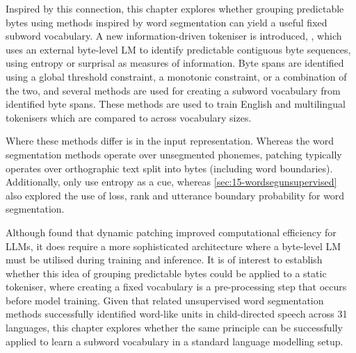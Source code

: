 Inspired by this connection, this chapter explores whether grouping predictable bytes using methods inspired by word segmentation can yield a useful fixed subword vocabulary. A new information-driven tokeniser is introduced, \bytespan, which uses an external byte-level LM to identify predictable contiguous byte sequences, using entropy or surprisal as measures of information. Byte spans are identified using a global threshold constraint, a monotonic constraint, or a combination of the two, and several methods are used for creating a subword vocabulary from identified byte spans. These methods are used to train English and multilingual tokenisers which are compared to \bpe across vocabulary sizes. 




Where these methods differ is in the input representation. Whereas the word segmentation methods operate over unsegmented phonemes, patching typically operates over orthographic text split into bytes (including word boundaries). Additionally, \citet{pagnoni2024byte} only use entropy as a cue, whereas \cref{sec:15-wordsegunsupervised} also explored the use of loss, rank and utterance boundary probability for word segmentation.

Although \citet{pagnoni2024byte} found that dynamic patching improved computational efficiency for LLMs, it does require a more sophisticated architecture where a byte-level LM must be utilised during training and inference. It is of interest to establish whether this idea of grouping predictable bytes could be applied to a static tokeniser, where creating a fixed vocabulary is a pre-processing step that occurs before model training. Given that related unsupervised word segmentation methods successfully identified word-like units in child-directed speech across 31 languages, this chapter explores whether the same principle can be successfully applied to learn a subword vocabulary in a standard language modelling setup. 

